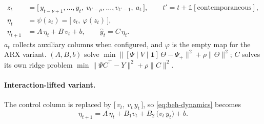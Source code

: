 \begin{align}
  z_t &= \bigl[\,y_{t-\nu+1},\dots,y_t,\ v_{t'-\mu},\dots,v_{t'-1},\ a_t\,\bigr],
        \qquad t' = t + \mathbb{1}[\text{contemporaneous}],
  \label{eq:beh-state}\\[4pt]
  \eta_t &= \psi(z_t) = \bigl[\,z_t,\ \varphi(z_t)\,\bigr],
  \label{eq:beh-lift}\\[4pt]
  \eta_{t+1} &= A\,\eta_t + B\,v_t + b,
  \qquad
  \hat y_t = C\,\eta_t.
  \label{eq:beh-dynamics}
\end{align}
%
\noindent $a_t$ collects auxiliary columns when configured, and $\varphi$ is the empty map for
the ARX variant. $(A,B,b)$ solve
$\min \lVert [\Psi \mid V \mid \mathbf{1}]\,\Theta - \Psi_{+}\rVert^2 + \rho\lVert\Theta\rVert^2$;
$C$ solves its own ridge problem $\min \lVert \Psi C^\top - Y\rVert^2 + \rho \lVert C \rVert^2$.

\paragraph{Interaction-lifted variant.}
The control column is replaced by $\bigl[\,v_t,\ v_t\,y_t\,\bigr]$, so
\eqref{eq:beh-dynamics} becomes
\begin{equation}
  \eta_{t+1} = A\,\eta_t + B_1 v_t + B_2\,\bigl(v_t\,y_t\bigr) + b.
  \label{eq:beh-interaction}
\end{equation}


